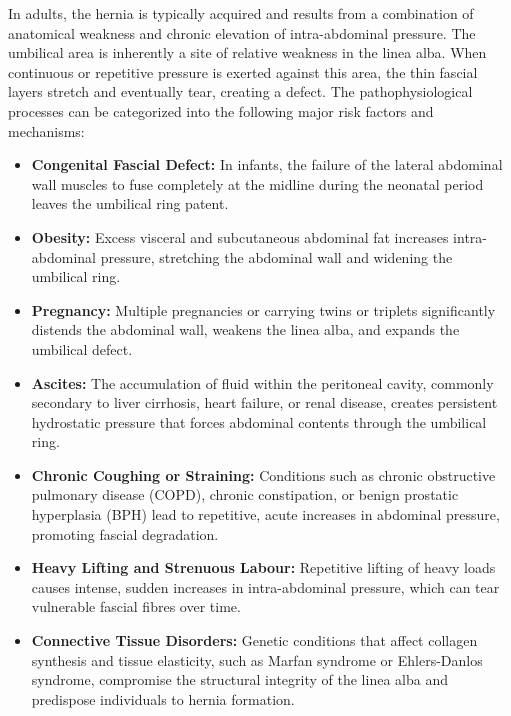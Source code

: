 In adults, the hernia is typically acquired and results from a combination of anatomical weakness and chronic elevation of intra-abdominal pressure. The umbilical area is inherently a site of relative weakness in the linea alba. When continuous or repetitive pressure is exerted against this area, the thin fascial layers stretch and eventually tear, creating a defect. The pathophysiological processes can be categorized into the following major risk factors and mechanisms:
\begin{itemize}
    \item \textbf{Congenital Fascial Defect:} In infants, the failure of the lateral abdominal wall muscles to fuse completely at the midline during the neonatal period leaves the umbilical ring patent.
    \item \textbf{Obesity:} Excess visceral and subcutaneous abdominal fat increases intra-abdominal pressure, stretching the abdominal wall and widening the umbilical ring.
    \item \textbf{Pregnancy:} Multiple pregnancies or carrying twins or triplets significantly distends the abdominal wall, weakens the linea alba, and expands the umbilical defect.
    \item \textbf{Ascites:} The accumulation of fluid within the peritoneal cavity, commonly secondary to liver cirrhosis, heart failure, or renal disease, creates persistent hydrostatic pressure that forces abdominal contents through the umbilical ring.
    \item \textbf{Chronic Coughing or Straining:} Conditions such as chronic obstructive pulmonary disease (COPD), chronic constipation, or benign prostatic hyperplasia (BPH) lead to repetitive, acute increases in abdominal pressure, promoting fascial degradation.
    \item \textbf{Heavy Lifting and Strenuous Labour:} Repetitive lifting of heavy loads causes intense, sudden increases in intra-abdominal pressure, which can tear vulnerable fascial fibres over time.
    \item \textbf{Connective Tissue Disorders:} Genetic conditions that affect collagen synthesis and tissue elasticity, such as Marfan syndrome or Ehlers-Danlos syndrome, compromise the structural integrity of the linea alba and predispose individuals to hernia formation.
\end{itemize}

